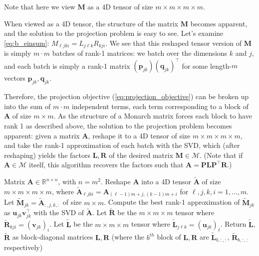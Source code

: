 Note that here we view $\mathbf{M}$ as a 4D tensor of size $m \times m \times m \times m$.

When viewed as a 4D tensor, the structure of the matrix $\mathbf{M}$ becomes apparent, and the solution to the projection problem is easy to see. Let's examine \ref{eq:b_einsum}: $M_{\ell jki} = L_{j\ell k} R_{kji}$. We see that this reshaped tensor version of $\mathbf{M}$ is simply $m \cdot m$ batches of rank-1 matrices: we batch over the dimensions $k$ and $j$, and each batch is simply a rank-1 matrix $(\mathbf{p}_{jk}) (\mathbf{q}_{jk})^\top$ for some length-$m$ vectors $\mathbf{p}_{jk}, \mathbf{q}_{jk}$.

Therefore, the projection objective (\ref{eq:projection_objective}) can be broken up into the sum of $m \cdot m$ independent terms, each term corresponding to a block of $\mathbf{A}$ of size $m \times m$. As the structure of a Monarch matrix forces each block to have rank 1 as described above, the solution to the projection problem becomes apparent: given a matrix $\mathbf{A}$, reshape it to a 4D tensor of size $m \times m \times m \times m$, and take the rank-1 approximation of each batch with the SVD, which (after reshaping) yields the factors $\mathbf{L}, \mathbf{R}$ of the desired matrix $\mathbf{M} \in \mathcal{M}$.
(Note that if $\mathbf{A} \in \mathcal{M}$ itself, this algorithm recovers the factors such that $\mathbf{A} = \mathbf{P} \mathbf{L} \mathbf{P}^\top\mathbf{R}$.)

\begin{algorithm}[H]
  \caption{\label{alg:project}Projection on the set of Monarch matrices}
  \begin{algorithmic}
    \REQUIRE Matrix $\mathbf{A} \in \mathbb{R}^{n \times n}$, with $n = m^2$.
    \STATE Reshape $\mathbf{A}$ into a 4D tensor $\widetilde{\mathbf{A}}$ of size $m \times m \times m \times m$, where
    $\widetilde{\mathbf{A}}_{\ell jki} = \mathbf{A}_{(\ell - 1) m + j, (k-1)m + i}$ for $\ell, j, k, i = 1, \dots, m$.\\
    \STATE Let $\widetilde{\mathbf{M}}_{jk} = \widetilde{\mathbf{A}}_{:, j, k, :}$ of size $m \times m$.
    \STATE Compute the best rank-1 approximation of $\widetilde{\mathbf{M}}_{jk}$ as $\mathbf{u}_{jk} \mathbf{v}_{jk}^\top$ with the SVD of $\widetilde{\mathbf{A}}$.
    \ENDFOR
    \STATE Let $\widetilde{\mathbf{R}}$ be the $m \times m \times m$ tensor where $\widetilde{\mathbf{R}}_{kji} = (\mathbf{v}_{jk})_i$.
    \STATE Let $\widetilde{\mathbf{L}}$ be the $m \times m \times m$ tensor where $\widetilde{\mathbf{L}}_{j \ell k} = (\mathbf{u}_{jk})_\ell$.
    \STATE Return $\widetilde{\mathbf{L}}$, $\widetilde{\mathbf{R}}$ as block-diagonal matrices $\mathbf{L}, \mathbf{R}$ (where the $b^{th}$ block of $\mathbf{L},\mathbf{R}$ are $\widetilde{\mathbf{L}}_{b,:,:}$, $\widetilde{\mathbf{R}}_{b,:,:}$ respectively)
  \end{algorithmic}
\end{algorithm}


